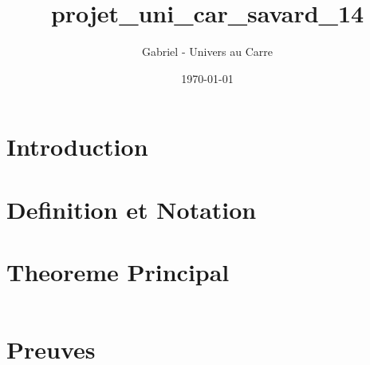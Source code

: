 \documentclass[12pt]{article}
\title{projet_uni_car_savard_14}
\author{Gabriel - Univers au Carre}
\date{\today}
\begin{document}
\maketitle


\section{Introduction}



\section{Definition et Notation}



\section{Theoreme Principal}


\begin{equation}
\end{equation}


\section{Preuves}


\end{document}
